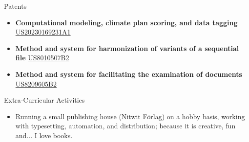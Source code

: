 \documentclass{resume} %
\begin{document}
\begin{rSection}{Patents}
\begin{itemize}

\item \textbf{Computational modeling, climate plan scoring, and data tagging}
  {\href{https://patents.google.com/patent/US20230169231A1/en}{US20230169231A1}}

\item \textbf{Method and system for harmonization of variants of a sequential file}
  {\href{https://patents.google.com/patent/US8010507B2/en}{US8010507B2}}

\item \textbf{Method and system for facilitating the examination of documents}
  {\href{https://patents.google.com/patent/US8209605B2/en}{US8209605B2}}





\end{itemize}


\end{rSection} 


\begin{rSection}{Extra-Curricular Activities} 
\begin{itemize}
  \item Running a small publishing house (Nitwit Förlag) on a hobby basis, working with typesetting, automation, and distribution; because it is creative, fun and... I love books.
\end{itemize}


\end{rSection}

\end{document}
